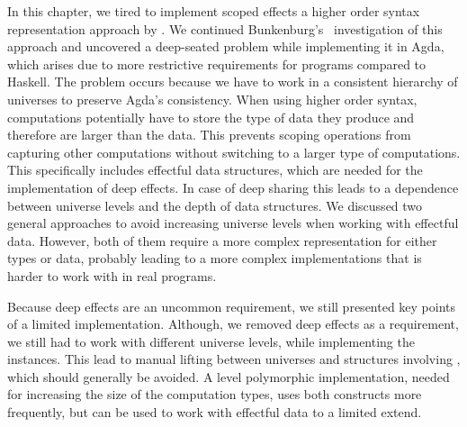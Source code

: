 In this chapter, we tired to implement scoped effects a higher order
syntax representation approach by \textcite{DBLP:conf/haskell/WuSH14}.
We continued Bunkenburg's~\cite{bunkenburg2019modeling} investigation of this
approach and uncovered a deep-seated problem while implementing it in Agda,
which arises due to more restrictive requirements for programs compared to
Haskell.
The problem occurs because we have to work in a consistent hierarchy of
universes to preserve Agda's consistency.
When using higher order syntax, computations potentially have to store the type
of data they produce and therefore are larger than the data.
This prevents scoping operations from capturing other computations without
switching to a larger type of computations.
This specifically includes effectful data structures, which are needed for the
implementation of deep effects.
In case of deep sharing this leads to a dependence between universe levels and
the depth of data structures.
We discussed two general approaches to avoid increasing universe levels when
working with effectful data.
However, both of them require a more complex representation for either types or
data, probably leading to a more complex implementations that is harder to
work with in real programs.

Because deep effects are an uncommon requirement, we still presented key points
of a limited implementation.
Although, we removed deep effects as a requirement, we still had to work with
different universe levels, while implementing the 
instances.
This lead to manual lifting between universes and structures involving
, which should generally be avoided.
A level polymorphic implementation, needed for increasing the size of the
computation types, uses both constructs more frequently, but can be used to work
with effectful data to a limited extend.
